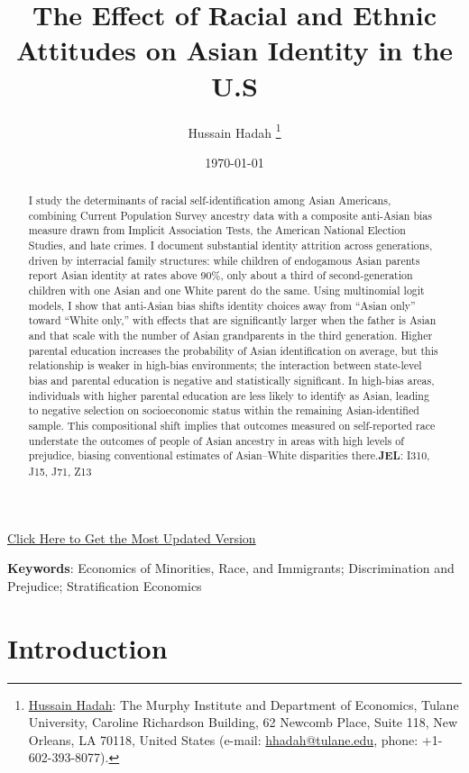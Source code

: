 \documentclass[12pt,english]{article}
\makeatletter
\newcommand{\PAPERKEYWORDS}{\textbf{Keywords}: Economics of Minorities, Race, and Immigrants; Discrimination and Prejudice; Stratification Economics}
\newcommand{\PAPERJEL}{\textbf{JEL}: I310, J15, J71, Z13}
\newcommand{\PAPERTITLE}{The Effect of Racial and Ethnic Attitudes on Asian Identity in the U.S}
\newcommand{\AUTHORHADAH}{Hussain Hadah}
\newcommand{\AUTHORHADAHURL}{https://orcid.org/0000-0002-8705-6386}
\newcommand{\AUTHORHADAHINFO}{\href{\AUTHORHADAHURL}{\AUTHORHADAH}: The Murphy Institute and Department of Economics, Tulane University, Caroline Richardson Building, 62 Newcomb Place, Suite 118, New Orleans, LA 70118, United States (e-mail: \href{mailto:hhadah@tulane.edu}{hhadah@tulane.edu}, phone: +1-602-393-8077)}
\newcommand{\PAPERABSTRACT}{
I study the determinants of racial self-identification among Asian Americans, combining Current Population Survey ancestry data with a composite anti-Asian bias measure drawn from Implicit Association Tests, the American National Election Studies, and hate crimes. I document substantial identity attrition across generations, driven by interracial family structures: while children of endogamous Asian parents report Asian identity at rates above 90\%, only about a third of second-generation children with one Asian and one White parent do the same. Using multinomial logit models, I show that anti-Asian bias shifts identity choices away from ``Asian only'' toward ``White only,'' with effects that are significantly larger when the father is Asian and that scale with the number of Asian grandparents in the third generation. Higher parental education increases the probability of Asian identification on average, but this relationship is weaker in high-bias environments; the interaction between state-level bias and parental education is negative and statistically significant. In high-bias areas, individuals with higher parental education are less likely to identify as Asian, leading to negative selection on socioeconomic status within the remaining Asian-identified sample. This compositional shift implies that outcomes measured on self-reported race understate the outcomes of people of Asian ancestry in areas with high levels of prejudice, biasing conventional estimates of Asian--White disparities there.\PAPERJEL} %
\makeatother
\begin{document}
\title{
\vspace*{-2em}
\onehalfspacing
\PAPERTITLE
}

\author{
\AUTHORHADAH{} \thanks{
\AUTHORHADAHINFO.
}}

\date{
\vspace*{-1em}
\today
}

\maketitle

\vspace*{-2.75em}
\begin{center}
\href{https://hhadah.github.io/asian-identity-attrition/my_paper/submit_preprint.pdf}{\footnotesize{Click Here to Get the Most Updated Version}}
\end{center}

\thispagestyle{empty}

\vspace*{-0.5em}
\begin{abstract}
\singlespacing
\PAPERABSTRACT
\end{abstract}
\vspace*{-0.5em}
{\small\PAPERKEYWORDS}
\thispagestyle{empty}
\clearpage

\setcounter{page}{1}
\renewcommand*{\thefootnote}{\arabic{footnote}}

\section{Introduction}\label{sec:intro}
\end{document}
